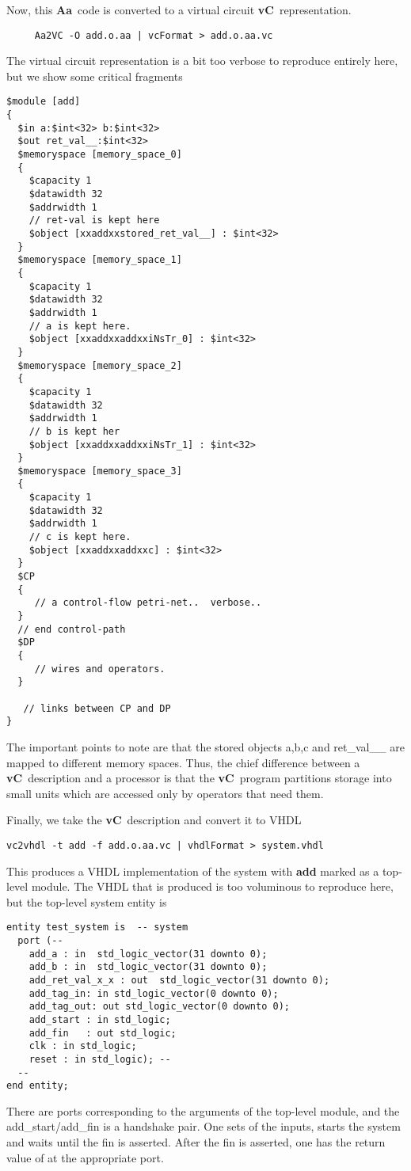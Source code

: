\documentclass{article}
\newcommand{\Aa}{{\bf Aa}~}
\newcommand{\vC}{{\bf vC}~}
\begin{document}
Now, this \Aa code is converted to a virtual circuit \vC representation.
\begin{verbatim}
     Aa2VC -O add.o.aa | vcFormat > add.o.aa.vc
\end{verbatim}
The virtual circuit representation is a bit too verbose to reproduce entirely
here, but we show some critical fragments
\begin{verbatim}
$module [add] 
{
  $in a:$int<32> b:$int<32>
  $out ret_val__:$int<32>
  $memoryspace [memory_space_0] 
  {
    $capacity 1
    $datawidth 32
    $addrwidth 1
    // ret-val is kept here
    $object [xxaddxxstored_ret_val__] : $int<32>
  }
  $memoryspace [memory_space_1] 
  {
    $capacity 1
    $datawidth 32
    $addrwidth 1
    // a is kept here.
    $object [xxaddxxaddxxiNsTr_0] : $int<32>
  }
  $memoryspace [memory_space_2] 
  {
    $capacity 1
    $datawidth 32
    $addrwidth 1
    // b is kept her
    $object [xxaddxxaddxxiNsTr_1] : $int<32>
  }
  $memoryspace [memory_space_3] 
  {
    $capacity 1
    $datawidth 32
    $addrwidth 1
    // c is kept here.
    $object [xxaddxxaddxxc] : $int<32>
  }
  $CP 
  {
     // a control-flow petri-net..  verbose..
  }
  // end control-path
  $DP 
  {
     // wires and operators.
  }

   // links between CP and DP
}
\end{verbatim}
The important points to note are that the stored objects a,b,c and
ret\_val\_\_ are mapped to different memory spaces.  Thus, the
chief difference between a \vC description and a processor is 
that the \vC program partitions storage into small units which
are accessed only by operators that need them. 

Finally, we take the \vC description and convert it to
VHDL
\begin{verbatim}
vc2vhdl -t add -f add.o.aa.vc | vhdlFormat > system.vhdl
\end{verbatim}
This produces a VHDL implementation of the system with
{\bf add} marked as a top-level module.  The VHDL that
is produced is too voluminous to reproduce here, but
the top-level system entity is
\begin{verbatim}
entity test_system is  -- system
  port (--
    add_a : in  std_logic_vector(31 downto 0);
    add_b : in  std_logic_vector(31 downto 0);
    add_ret_val_x_x : out  std_logic_vector(31 downto 0);
    add_tag_in: in std_logic_vector(0 downto 0);
    add_tag_out: out std_logic_vector(0 downto 0);
    add_start : in std_logic;
    add_fin   : out std_logic;
    clk : in std_logic;
    reset : in std_logic); --
  --
end entity;
\end{verbatim}
There are ports corresponding to the arguments of the top-level module,
and the add\_start/add\_fin is a handshake pair.  One sets of the inputs,
starts the system and waits until the fin is asserted.  After the fin
is asserted, one has the return value of at the appropriate port.
\end{document}
